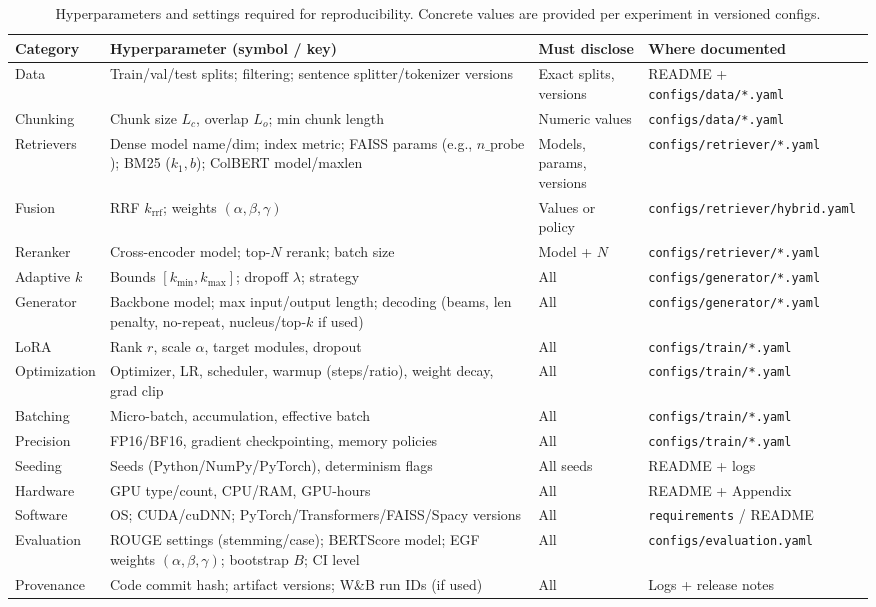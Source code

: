 \documentclass[11pt,a4paper]{article}
\begin{document}
\begin{table}[H]
\centering
\small
\setlength{\tabcolsep}{5pt}
\begin{tabular}{p{2.8cm} p{5.2cm} p{3.6cm} p{3.2cm}}
\toprule
\textbf{Category} & \textbf{Hyperparameter (symbol / key)} & \textbf{Must disclose} & \textbf{Where documented} \\
\midrule
Data & Train/val/test splits; filtering; sentence splitter/tokenizer versions & Exact splits, versions & README + \texttt{configs/data/*.yaml} \\
Chunking & Chunk size $L_c$, overlap $L_o$; min chunk length & Numeric values & \texttt{configs/data/*.yaml} \\
Retrievers & Dense model name/dim; index metric; FAISS params (e.g., $n\_\text{probe}$); BM25 ($k_1,b$); ColBERT model/maxlen & Models, params, versions & \texttt{configs/retriever/*.yaml} \\
Fusion & RRF $k_{\text{rrf}}$; weights $(\alpha,\beta,\gamma)$ & Values or policy & \texttt{configs/retriever/hybrid.yaml} \\
Reranker & Cross-encoder model; top-$N$ rerank; batch size & Model + $N$ & \texttt{configs/retriever/*.yaml} \\
Adaptive $k$ & Bounds $[k_{\min},k_{\max}]$; dropoff $\lambda$; strategy & All & \texttt{configs/generator/*.yaml} \\
Generator & Backbone model; max input/output length; decoding (beams, len penalty, no-repeat, nucleus/top-$k$ if used) & All & \texttt{configs/generator/*.yaml} \\
LoRA & Rank $r$, scale $\alpha$, target modules, dropout & All & \texttt{configs/train/*.yaml} \\
Optimization & Optimizer, LR, scheduler, warmup (steps/ratio), weight decay, grad clip & All & \texttt{configs/train/*.yaml} \\
Batching & Micro-batch, accumulation, effective batch & All & \texttt{configs/train/*.yaml} \\
Precision & FP16/BF16, gradient checkpointing, memory policies & All & \texttt{configs/train/*.yaml} \\
Seeding & Seeds (Python/NumPy/PyTorch), determinism flags & All seeds & README + logs \\
Hardware & GPU type/count, CPU/RAM, GPU-hours & All & README + Appendix \\
Software & OS; CUDA/cuDNN; PyTorch/Transformers/FAISS/Spacy versions & All & \texttt{requirements} / README \\
Evaluation & ROUGE settings (stemming/case); BERTScore model; EGF weights $(\alpha,\beta,\gamma)$; bootstrap $B$; CI level & All & \texttt{configs/evaluation.yaml} \\
Provenance & Code commit hash; artifact versions; W\&B run IDs (if used) & All & Logs + release notes \\
\bottomrule
\end{tabular}
\caption{Hyperparameters and settings required for reproducibility. Concrete values are provided per experiment in versioned configs.}
\label{tab:hparams}
\end{table}
\end{document}
